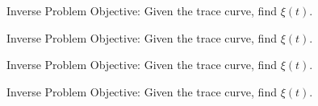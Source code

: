 \documentclass{beamer}
\begin{document}
\begin{frame}{Inverse Problem}
    Objective: Given the trace curve, find $\xi(t)$.
\begin{adjustbox}{max totalsize={\textwidth}{\textheight}}

\end{adjustbox}
\end{frame}

\begin{frame}{Inverse Problem}
    Objective: Given the trace curve, find $\xi(t)$.
\begin{adjustbox}{max totalsize={\textwidth}{\textheight}}

\end{adjustbox}
\end{frame}

\begin{frame}{Inverse Problem}
    Objective: Given the trace curve, find $\xi(t)$.
\begin{adjustbox}{max totalsize={\textwidth}{\textheight}}

\end{adjustbox}
\end{frame}

\begin{frame}{Inverse Problem}
    Objective: Given the trace curve, find $\xi(t)$.
\begin{adjustbox}{max totalsize={\textwidth}{\textheight}}

\end{adjustbox}
\end{frame}
\end{document}

